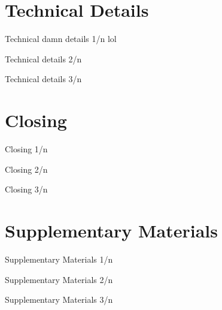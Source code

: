 \section{Technical Details}
\begin{frame}{Technical damn details 1/n lol}
\blindmathpaper
\end{frame}

\begin{frame}{Technical details 2/n}
\blindmathpaper
\end{frame}

\begin{frame}{Technical details 3/n}
\blindmathpaper
\end{frame}

\section{Closing}
\begin{frame}{Closing 1/n}
\blindtext    
\end{frame}

\begin{frame}{Closing 2/n}
\blindtext    
\end{frame}

\begin{frame}{Closing 3/n}
\blindtext    
\end{frame}

\section{Supplementary Materials}
\begin{frame}{Supplementary Materials 1/n}
\blindmathpaper
\end{frame}

\begin{frame}{Supplementary Materials 2/n}
\blindmathpaper
\end{frame}

\begin{frame}{Supplementary Materials 3/n}
\blindmathpaper
\end{frame}
